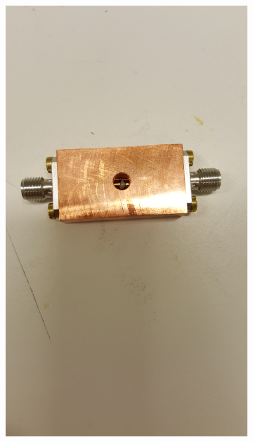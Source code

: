 \documentclass[main.tex]{subfiles}
\begin{document}
\begin{figure}[h]
\begin{subfigure}{0.25\textwidth}
        \includegraphics[angle=-90,trim=1000 100 2000 100,clip,width=0.97\linewidth]{figure/Filterbilder/filter_before_solder.jpg} 
        \caption{}
        \label{fig:before_solder}
    \end{subfigure}
    \begin{subfigure}{0.25\textwidth}
        \centering

\end{subfigure}
\end{figure}
\end{document}
